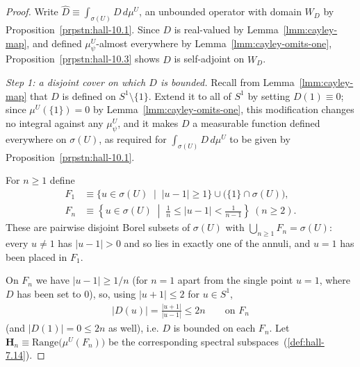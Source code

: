 \begin{proof}
    \leanok
Write $\widehat{D} \equiv \int_{\sigma(U)} D \, d\mu^U$, an unbounded operator with domain $W_D$ by Proposition~\ref{prpstn:hall-10.1}. Since $D$ is real-valued by Lemma~\ref{lmm:cayley-map}, and defined $\mu^U_\psi$-almost everywhere by Lemma~\ref{lmm:cayley-omits-one}, Proposition~\ref{prpstn:hall-10.3} shows $\widehat{D}$ is self-adjoint on $W_D$.

\textit{Step 1: a disjoint cover on which $D$ is bounded.} Recall from Lemma~\ref{lmm:cayley-map} that $D$ is defined on $S^1\setminus\{1\}$. Extend it to all of $S^1$ by setting $D(1) \equiv 0$; since $\mu^U(\{1\}) = 0$ by Lemma~\ref{lmm:cayley-omits-one}, this modification changes no integral against any $\mu^U_\psi$, and it makes $D$ a measurable function defined everywhere on $\sigma(U)$, as required for $\int_{\sigma(U)} D \, d\mu^U$ to be given by Proposition~\ref{prpstn:hall-10.1}.

For $n \ge 1$ define
\begin{align}
    F_1 &\equiv \big\{ u \in \sigma(U) \;\mid\; \lvert u-1 \rvert \ge 1 \big\} \cup \big( \{1\} \cap \sigma(U) \big), \\
    F_n &\equiv \left\{ u \in \sigma(U) \;\middle|\; \frac{1}{n} \le \lvert u - 1 \rvert < \frac{1}{n-1} \right\} \ (n \ge 2).
\end{align}
These are pairwise disjoint Borel subsets of $\sigma(U)$ with $\bigcup_{n\ge1} F_n = \sigma(U)$: every $u \ne 1$ has $\lvert u-1\rvert > 0$ and so lies in exactly one of the annuli, and $u=1$ has been placed in $F_1$.

On $F_n$ we have $\lvert u-1 \rvert \ge 1/n$ (for $n=1$ apart from the single point $u=1$, where $D$ has been set to $0$), so, using $\lvert u+1 \rvert \le 2$ for $u \in S^1$,
\begin{align}
    \lvert D(u) \rvert = \frac{\lvert u+1 \rvert}{\lvert u-1 \rvert} \le 2n \qquad \text{on } F_n
\end{align}
(and $\lvert D(1) \rvert = 0 \le 2n$ as well), i.e. $D$ is bounded on each $F_n$. Let $\mathbf{H}_n \equiv \text{Range}\big( \mu^U(F_n) \big)$ be the corresponding spectral subspaces~(\ref{def:hall-7.14}).


\end{proof}
